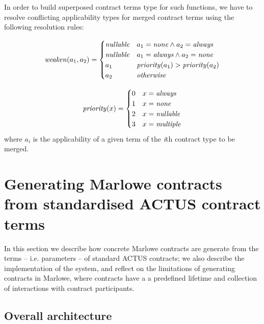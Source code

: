 \documentclass[runningheads]{llncs}
\newcommand{\ident}[1]{\mbox{\emph{#1}}}
\begin{document}
In order to build superposed contract terms type for such functions,
we have to resolve conflicting applicability types for merged contract terms
using the following resolution rules:

\noindent 
\begin{equation*}
\ident{weaken}(a_{1},a_{2})=\begin{cases}
\ident{nullable} & a_{1}=\ident{none}\wedge a_{2}=\ident{always}\\
\ident{nullable} & a_{1}=\ident{always}\wedge a_{2}=\ident{none}\\
a_{1} & \ident{priority}(a_{1})>\ident{priority}(a_{2})\\
a_{2} & \ident{otherwise}
\end{cases}
\end{equation*}

\noindent 
\begin{equation*}
\ident{priority}(x)=\begin{cases}
0 & x=\ident{always}\\
1 & x=\ident{none}\\
2 & x=\ident{nullable}\\
3 & x=\ident{multiple}
\end{cases}
\end{equation*}
\noindent
where $a_{i}$ is the applicability of a given term of the \emph{i}th contract
type to be merged.

\section{Generating Marlowe contracts from standardised ACTUS contract terms}
\label{generation}

In this section we describe how concrete Marlowe contracts are generate from the terms -- i.e. parameters -- of standard ACTUS contracts; we also describe the implementation of the system, and reflect on the limitations of generating contracts in Marlowe, where contracts have a a predefined lifetime and collection of interactions with contract participants.

\subsection{Overall architecture }
\end{document}
